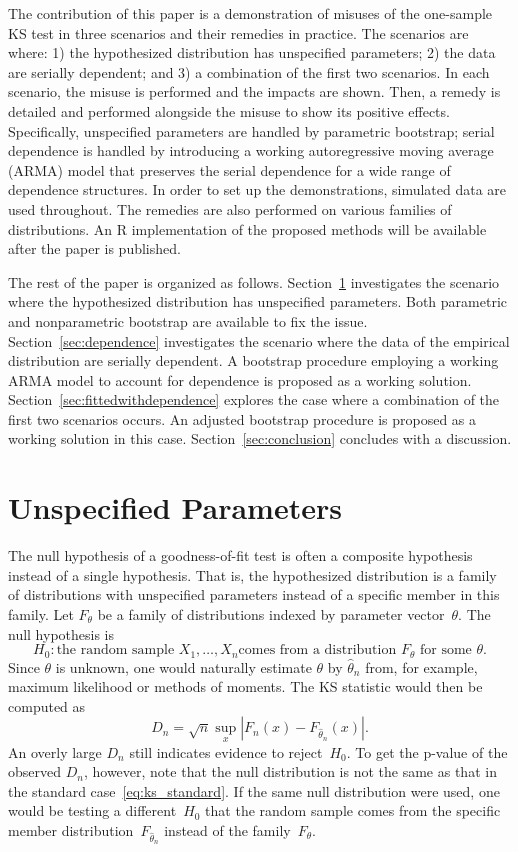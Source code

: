 \documentclass[12pt, letterpaper, titlepage]{article}
\begin{document}
The contribution of this paper is a demonstration of misuses of the one-sample
KS test in three scenarios and their remedies in practice. The scenarios are
where:
1) the hypothesized distribution has unspecified parameters;
2) the data are serially dependent; and
3) a combination of the first two scenarios.
In each scenario, the misuse is performed and the impacts are shown. Then, a
remedy is detailed and performed alongside the misuse to show its positive
effects. Specifically, unspecified parameters are handled by parametric
bootstrap; serial dependence is handled by introducing a working autoregressive
moving average (ARMA) model that preserves the serial dependence for a wide
range of dependence structures.
In order to set up the demonstrations, simulated data are used
throughout. The remedies are also performed on various families of
distributions. An R implementation of the proposed methods will be available
after the paper is published.


The rest of the paper is organized as follows. Section~\ref{sec:fitted}
investigates the scenario where the hypothesized distribution has unspecified
parameters. Both parametric and nonparametric bootstrap are available to fix the
issue. Section~\ref{sec:dependence} investigates the scenario where the data of
the empirical distribution are serially dependent. A bootstrap procedure
employing a working ARMA model to account for dependence is proposed as a
working solution. Section~\ref{sec:fittedwithdependence}
explores the case where a combination of the first two scenarios occurs. An  
adjusted bootstrap procedure is proposed as a working solution in this case.  
Section~\ref{sec:conclusion} concludes with a discussion.

\section{Unspecified Parameters}
\label{sec:fitted}

The null hypothesis of a goodness-of-fit test is often a composite hypothesis
instead of a single hypothesis. That is, the hypothesized distribution is a
family of distributions with unspecified parameters instead of a specific member
in this family. Let $F_\theta$ be a family of distributions indexed by parameter
vector~$\theta$. The null hypothesis is
\[
  H_0: \text{the random sample $X_1, \ldots, X_n$
    comes from a distribution $F_\theta$ for some $\theta$.}
\]
Since $\theta$ is unknown, one would naturally estimate $\theta$ by
$\hat\theta_n$ from, for example, maximum likelihood or methods of moments. The
KS statistic would then be computed as
\begin{equation}
  \label{eq:ks_fitted}
  D_n = \sqrt{n} \sup_x | F_n(x) - F_{\hat\theta_n}(x) |.
\end{equation}
An overly large $D_n$ still indicates evidence to reject~$H_0$. To get the
p-value of the observed $D_n$, however, note that the null distribution is not
the same as that in the standard
case~\eqref{eq:ks_standard}. If the same null distribution were used, one would
be testing a different~$H_0$ that the random sample comes from the specific
member distribution~$F_{\hat\theta_n}$ instead of the family~$F_\theta$.
\end{document}

